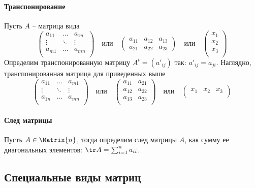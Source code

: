 \paragraph{Транспонирование}
Пусть $A$ -- матрица вида
\[
\begin{pmatrix}
{a_{11}}&{\ldots}&{a_{1n}}\\
{\vdots}&{\ddots}&{\vdots}\\
{a_{m1}}&{\ldots}&{a_{mn}}\\
\end{pmatrix}\quad \text{или}\quad
\begin{pmatrix}
{a_{11}}&{a_{12}}&{a_{13}}\\
{a_{21}}&{a_{22}}&{a_{23}}
\end{pmatrix}\quad \text{или}\quad
\begin{pmatrix}
{x_1}\\
{x_2}\\
{x_3}\\
\end{pmatrix}
\]
Определим транспонированную матрицу $A^t = (a'_{ij})$ так: $a'_{ij} = a_{ji}$.
Наглядно, транспонированная матрица для приведенных выше
\[
\begin{pmatrix}
{a_{11}}&{\ldots}&{a_{m1}}\\
{\vdots}&{\ddots}&{\vdots}\\
{a_{1n}}&{\ldots}&{a_{mn}}\\
\end{pmatrix}\quad\text{или}\quad
\begin{pmatrix}
{a_{11}}&{a_{21}}\\
{a_{12}}&{a_{22}}\\
{a_{13}}&{a_{23}}\\
\end{pmatrix}\quad \text{или}\quad
\begin{pmatrix}
{x_1}&{x_2}&{x_3}\\
\end{pmatrix}
\]

\paragraph{След матрицы}
Пусть $A\in\Matrix{n}$, тогда определим след матрицы $A$, как сумму ее диагональных элементов: $\tr A = \sum_{i=1}^n a_{ii}$.


\subsection{Специальные виды матриц}

